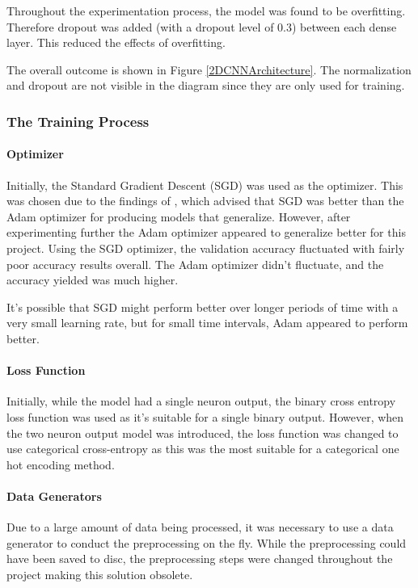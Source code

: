 \documentclass[12pt,a4paper]{article}
\begin{document}
                Throughout the experimentation process, the model was found to be overfitting. Therefore dropout was added (with a dropout level of 0.3) between each dense layer. This reduced the effects of overfitting.

                The overall outcome is shown in Figure \ref{2DCNNArchitecture}. The normalization and dropout are not visible in the diagram since they are only used for training.

        
            \subsubsection{The Training Process}
                \paragraph{Optimizer}
                Initially, the Standard Gradient Descent (SGD) was used as the optimizer. This was chosen due to the findings of \cite{SGDBetterThanAdamForImageClassification},
                which advised that SGD was better than the Adam optimizer for producing models that generalize. However, after experimenting further the Adam optimizer appeared to generalize better for this project. Using the SGD optimizer, the validation accuracy fluctuated with fairly poor accuracy results overall. The Adam optimizer didn't fluctuate, and the accuracy yielded was much higher.

                It's possible that SGD might perform better over longer periods of time with a very small learning rate, but for small time intervals, Adam appeared to perform better.


                \paragraph{Loss Function}
                Initially, while the model had a single neuron output, the binary cross entropy loss function was used as it's suitable for a single binary output.
                However, when the two neuron output model was introduced, the loss function was changed to use categorical cross-entropy as this was the most suitable
                for a categorical one hot encoding method.

                \paragraph{Data Generators}
                Due to a large amount of data being processed, it was necessary to use a data generator to conduct the preprocessing on the fly. While the preprocessing could have been saved to disc, the preprocessing steps were changed throughout the project making this solution obsolete.
\end{document}
